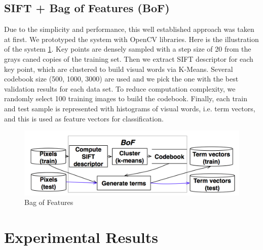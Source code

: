 \documentclass[journal, 10pt]{IEEEtran}
\begin{document}
  \subsection{SIFT + Bag of Features (BoF) }
  Due to the simplicity and performance, this well established approach was taken at first.  We prototyped the system with OpenCV libraries.  Here is the illustration of the system \ref{fig:bofsystemdesign}.
  Key points are densely sampled with a step size of 20 from the grays caned copies of the training set. Then we extract SIFT descriptor for each key point, which are clustered to build visual words via K-Means. Several codebook size (500, 1000, 3000) are used and we pick the one with the best validation results for each data set. To reduce computation complexity, we randomly select 100 training images to build the codebook.  Finally, each train and test sample is represented with histograms of visual words, i.e. term vectors, and this is used as feature vectors for classification.
\begin{figure}[H]
  \centering
  \includegraphics[width=1.00\linewidth]{bof}
  \caption{ Bag of Features }
  \label{fig:bofsystemdesign}
\end{figure}

\section{Experimental Results}
\end{document}
